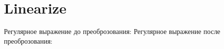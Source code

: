 \section{Linearize}
\begin{frame}{}
	Регулярное выражение до преоброзования:
	Регулярное выражение после преоброзования:
\end{frame}
